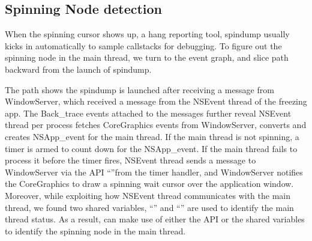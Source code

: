 \subsection{Spinning Node detection}

When the spinning cursor shows up, a hang reporting tool, spindump usually
kicks in automatically to sample callstacks for debugging. To figure out the
spinning node in the main thread, we turn to the event graph, and slice path
backward from the launch of spindump.

The path shows the spindump is launched after receiving a message from
WindowServer, which received a message from the NSEvent thread of the freezing
app. The Back\_trace events attached to the messages further reveal NSEvent
thread per process fetches CoreGraphics events from WindowServer, converts and
creates NSApp\_event for the main thread. If the main thread is not spinning,
a timer is armed to count down for the NSApp\_event. If the main thread
fails to process it before the timer fires, NSEvent thread sends a message
to WindowServer via the API ``''from the timer
handler, and WindowServer notifies the CoreGraphics to draw a spinning wait
cursor over the application window. Moreover, while exploiting how NSEvent
thread communicates with the main thread, we found two shared variables,
``'' and ``'' are used
to identify the main thread status. As a result, \xxx can make use of either the
API or the shared variables to identify the spinning node in the main thread.
